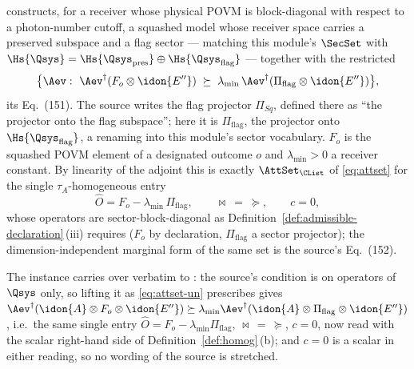 
\begin{example}
\label{ex:fss}
\cite[Lemma~9.4, Eqs.~(151)--(152)]{tupkary2026decoy} constructs, for
a receiver whose physical POVM is block-diagonal with respect to a
photon-number cutoff, a squashed model whose receiver space carries a
preserved subspace and a flag sector --- matching this module's
$\SecSet$ with
$\Hs{\Qsys}=\Hs{\Qsys_{\mathrm{pres}}}\oplus\Hs{\Qsys_{\mathrm{flag}}}$
--- together with the restricted 
\begin{equation*}
  \big\{\Aev:\ \Aev^{\dagger}(F_o\otimes\idon{E''})\;\succeq\;
  \lambda_{\min}\,\Aev^{\dagger}(\Pi_{\mathrm{flag}}\otimes\idon{E''})
  \big\},
\end{equation*}
its Eq.~(151). The source writes the flag projector $\Pi_{Sq}$, defined there
as ``the projector onto the flag subspace''; here it is
$\Pi_{\mathrm{flag}}$, the projector onto $\Hs{\Qsys_{\mathrm{flag}}}$, a
renaming into this module's sector vocabulary. $F_o$ is the squashed POVM
element of a designated outcome $o$ and $\lambda_{\min}>0$ a receiver
constant. By linearity of the adjoint this is exactly
$\AttSet_{\CList}$ of \eqref{eq:attset} for the single
$\tau_A$-homogeneous entry
\begin{equation*}
  \hat O=F_o-\lambda_{\min}\,\Pi_{\mathrm{flag}},\qquad
  \bowtie\ =\ \succeq,\qquad c=0,
\end{equation*}
whose operators are sector-block-diagonal as
Definition~\ref{def:admissible-declaration}\,(iii) requires ($F_o$ by declaration,
$\Pi_{\mathrm{flag}}$ a sector projector); the dimension-independent
marginal form of the same set is the source's Eq.~(152).

The instance carries over verbatim to : the
source's condition is on operators of $\Qsys$ only, so lifting it as
\eqref{eq:attset-un} prescribes gives
$\Aev^{\dagger}(\idon{A}\otimes F_o\otimes\idon{E''})\succeq
\lambda_{\min}\Aev^{\dagger}(\idon{A}\otimes\Pi_{\mathrm{flag}}
\otimes\idon{E''})$, i.e.\ the same single entry
$\hat O=F_o-\lambda_{\min}\Pi_{\mathrm{flag}}$, $\bowtie\,=\,\succeq$,
$c=0$, now read with the scalar right-hand side of
Definition~\ref{def:homog}\,(b); and $c=0$ is a scalar in either
reading, so no wording of the source is stretched.


\end{example}
